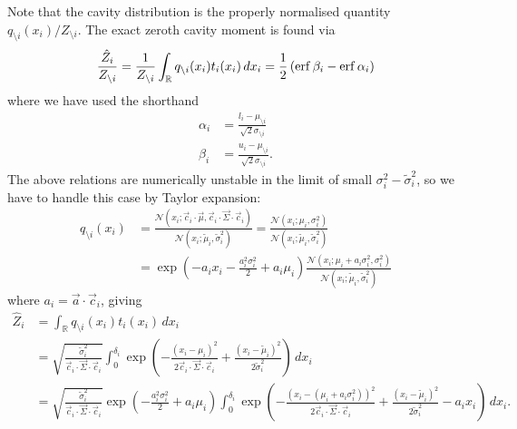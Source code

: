 \documentclass[11pt,twoside]{report}
\begin{document}
Note that the cavity distribution is the properly normalised quantity $q_{\setminus i}(x_i) / Z_{\setminus i}$.
The exact zeroth cavity moment is found via
\begin{equation}\label{eq:exact-zeroth-moment}
  \frac{\hat{Z}_i}{Z_{\setminus i}} =
  \frac{1}{Z_{\setminus i}}
  \int_{\mathbb{R}} q_{\setminus i}(x_i) t_i(x_i) \, dx_i
  = \frac{1}{2} \left( \operatorname{erf}{\beta_i} - \operatorname{erf}{\alpha_i} \right)
\end{equation}
where we have used the shorthand
\begin{align}
  \alpha_i &= \frac{l_i - \mu_{\setminus i}}{\sqrt{2} \sigma_{\setminus i}} \\
  \beta_i &= \frac{u_i - \mu_{\setminus i}}{\sqrt{2} \sigma_{\setminus i}}.
\end{align}
The above relations are numerically unstable in the limit of small $\sigma_i^2 - \tilde{\sigma}_i^2$, so we have to handle this case by Taylor expansion:
\begin{align}
  q_{\setminus i}(x_i) &=
  \frac{
    \mathcal{N}(x_i; \vec{c}_i \cdot \vec{\mu}, \vec{c}_i \cdot \vec{\Sigma} \cdot \vec{c}_i)
  }{
    \mathcal{N}(x_i; \tilde{\mu}_i, \tilde{\sigma}_i^2)
  }
  =
  \frac{\mathcal{N}(x_i; \mu_i, \sigma_i^2)}{
    \mathcal{N}(x_i; \tilde{\mu}_i, \tilde{\sigma}_i^2)
  }
  \\
  &=
  \exp{\left(-a_i x_i
    - \frac{a_i^2 \sigma_i^2}{2}
    + a_i \mu_i
    \right)}
  \frac{\mathcal{N}(x_i; \mu_i + a_i \sigma_i^2, \sigma_i^2)}{
    \mathcal{N}(x_i; \tilde{\mu}_i, \tilde{\sigma}_i^2)
  }
\end{align}
where $a_i = \vec{a} \cdot \vec{c}_i$, giving
\begin{align}
  \hat{Z}_i
  &=
  \int_{\mathbb{R}} q_{\setminus i}(x_i) t_i(x_i) \, dx_i \\
  &=
  \sqrt{ \frac{\tilde{\sigma}_i^2}{\vec{c}_i \cdot \vec{\Sigma} \cdot \vec{c}_i} }
  \int_0^{\delta_i}
  \exp{\left( -\frac{(x_i - \mu_i)^2}{2 \vec{c}_i \cdot \vec{\Sigma} \cdot \vec{c}_i} +
    \frac{(x_i - \tilde{\mu}_i)^2}{2 \tilde{\sigma}_i^2} \right)} \, dx_i
  \\
  &=
  \sqrt{ \frac{\tilde{\sigma}_i^2}{\vec{c}_i \cdot \vec{\Sigma} \cdot \vec{c}_i} }
  \exp{\left(
    - \frac{a_i^2 \sigma_i^2}{2}
    + a_i \mu_i
    \right)}
  \int_0^{\delta_i}
  \exp{\left( -\frac{(x_i - (\mu_i + a_i \sigma_i^2))^2}{2 \vec{c}_i \cdot \vec{\Sigma} \cdot \vec{c}_i} +
    \frac{(x_i - \tilde{\mu}_i)^2}{2 \tilde{\sigma}_i^2} - a_i x_i \right)} \, dx_i.
\end{align}
\end{document}
